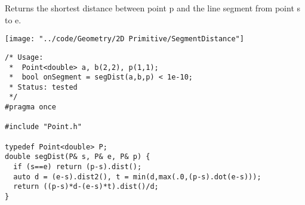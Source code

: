 \begin{minipage}{75mm}
Returns the shortest distance between point p and the line segment from point s to e.
\end{minipage}
\begin{minipage}{15mm}
\vspace{-10mm}
\texttt{[image: "../code/Geometry/2D Primitive/SegmentDistance"]}
\end{minipage}
\begin{verbatim}
/* Usage: 
 *  Point<double> a, b(2,2), p(1,1);
 *  bool onSegment = segDist(a,b,p) < 1e-10;
 * Status: tested
 */
#pragma once

#include "Point.h"

typedef Point<double> P;
double segDist(P& s, P& e, P& p) {
  if (s==e) return (p-s).dist();
  auto d = (e-s).dist2(), t = min(d,max(.0,(p-s).dot(e-s)));
  return ((p-s)*d-(e-s)*t).dist()/d;
}

\end{verbatim}